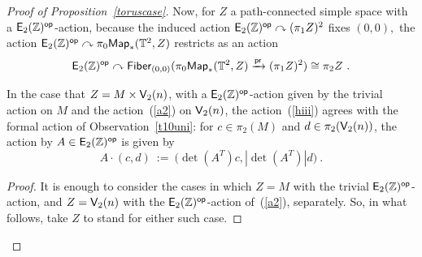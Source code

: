 \begin{proof}[Proof of Proposition~\ref{toruscase}]
Now, for $Z$ a path-connected simple space with a $\mathsf E_2(\mathbb Z)^{\operatorname{\mathsf{op}}}$-action, 
because the induced action $\mathsf E_2(\mathbb Z)^{\operatorname{\mathsf{op}}} \curvearrowright (\pi_{1}Z)^{2}$ fixes $(0, 0),$ the action $\mathsf E_2(\mathbb Z)^{\operatorname{\mathsf{op}}} \curvearrowright \pi_{0}{\sf Map}_{\ast}(\mathbb T^{2}, Z)$ restricts as an action 
\begin{equation} \label{hiii}
\mathsf E_2(\mathbb Z)^{\operatorname{\mathsf{op}}} \curvearrowright {\sf Fiber}_{(0, 0)}(\pi_{0}{\sf Map}_{\ast}(\mathbb T^{2}, Z) \xrightarrow{\operatorname{\mathsf{pr}}} (\pi_{1}Z)^{2}) \cong \pi_{2}Z~.
\end{equation}
\begin{claim}
In the case that $Z=M \times \mathsf V_2(n)$, with a $\mathsf E_2(\mathbb Z)^{\operatorname{\mathsf{op}}}$-action given by the trivial action on $M$ and the action~(\ref{a2}) on $\mathsf V_2(n)$, the action~(\ref{hiii}) agrees with the formal action of Observation~\ref{t10uni}: for $c \in \pi_2(M)$ and $d\in \pi_2(\mathsf V_2(n))$, the action by $A\in \mathsf E_2(\mathbb Z)^{\operatorname{\mathsf{op}}}$ is given by
\[
A \cdot (c,d)
~:=~
\bigl(
\det(A^T) c , | \det(A^T)| d 
\bigr)
~.
\]

\end{claim}
\begin{proof}
It is enough to consider the cases in which $Z=M$ with the trivial $\mathsf E_2(\mathbb Z)^{\operatorname{\mathsf{op}}}$-action, and $Z=\mathsf V_2(n)$ with the $\mathsf E_2(\mathbb Z)^{\operatorname{\mathsf{op}}}$-action of~(\ref{a2}), separately.  
So, in what follows, take $Z$ to stand for either such case.  




\end{proof}
\end{proof}
